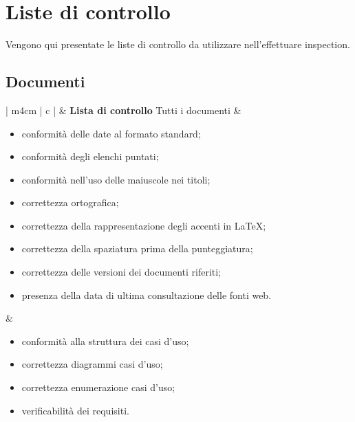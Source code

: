 \section{Liste di controllo}
\label{listeControllo}

	Vengono qui presentate le liste di controllo da utilizzare nell'effettuare inspection.

\subsection{Documenti}

	\begin{longtable}{| m{4cm} | c |}
	\hline
		\Gape[0.4cm][0.4cm]{\textbf{Documento}}
		&
		\textbf{Lista di controllo}
	\hline
		Tutti i documenti
		&
		\begin{minipage}[c]{0.7\textwidth}
			\vspace{0.2cm}
			\begin{itemize}
				\item conformità delle date al formato standard;
				\item conformità degli elenchi puntati;
				\item conformità nell'uso delle maiuscole nei titoli;
				\item correttezza ortografica;
				\item correttezza della rappresentazione degli accenti in \LaTeX{};
				\item correttezza della spaziatura prima della punteggiatura;
				\item correttezza delle versioni dei documenti riferiti;
				\item presenza della data di ultima consultazione delle fonti web.
			\end{itemize}
			\vspace{0.2cm}
		\end{minipage}
	\hline
		\AnalisiRequisiti{}
		&
		\begin{minipage}[c]{0.7\textwidth}
			\vspace{0.2cm}
			\begin{itemize}
    				\item conformità alla struttura dei casi d'uso;
    				\item correttezza diagrammi casi d'uso;
    				\item correttezza enumerazione casi d'uso;
    				\item verificabilità dei requisiti.
			\end{itemize}
			\vspace{0.2cm}

\end{minipage}
\end{longtable}
